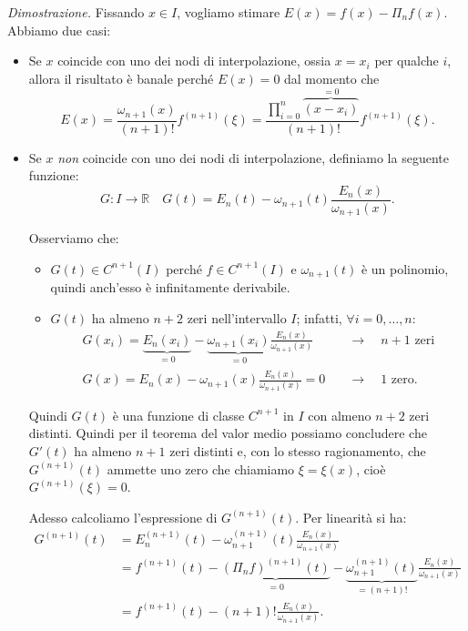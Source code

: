 \textit{Dimostrazione.}
Fissando $x\in I$, vogliamo stimare $E(x) =f(x) -\Pi _{n} f(x)$. Abbiamo due casi:
\begin{itemize}
\item Se $x$ coincide con uno dei nodi di interpolazione, ossia $x=x_{i}$ per qualche $i$, allora il risultato è banale perché $E(x) =0$ dal momento che
\begin{equation*}
E(x) =\frac{\omega _{n+1}(x)}{( n+1) !} f^{( n+1)}( \xi ) =\frac{\prod\nolimits ^{n}_{i=0}\overbrace{( x-x_{i})}^{=0}}{( n+1) !} f^{( n+1)}( \xi ).
\end{equation*}
\item Se $x$ \textit{non} coincide con uno dei nodi di interpolazione, definiamo la seguente funzione:
\begin{equation*}
G:I\rightarrow \mathbb{R} \quad G(t) =E_{n}(t) -\omega _{n+1}(t)\frac{E_{n}(x)}{\omega _{n+1}(x)}.
\end{equation*}

Osserviamo che:
\begin{itemize}
\item $G(t) \in C^{n+1}(I)$ perché $f\in C^{n+1}(I)$ e $\omega _{n+1}(t)$ è un polinomio, quindi anch'esso è infinitamente derivabile.
\item $G(t)$ ha almeno $n+2$ zeri nell'intervallo $I$; infatti, $\forall i=0,\dotsc ,n$:
\begin{align*}
	G( x_{i}) =\underbrace{E_{n}( x_{i})}_{=0} -\underbrace{\omega _{n+1}( x_{i})}_{=0}\frac{E_{n}(x)}{\omega _{n+1}(x)} & \quad \rightarrow \quad n+1 \text{ zeri} \\
	G(x) =E_{n}(x) -\omega _{n+1}(x)\frac{E_{n}(x)}{\omega _{n+1}(x)} =0 & \quad \rightarrow \quad 1 \text{ zero.}
\end{align*}
\end{itemize}

Quindi $G(t)$ è una funzione di classe $C^{n+1}$ in $I$ con almeno $n+2$ zeri distinti. Quindi per il teorema del valor medio possiamo concludere che $G'(t)$ ha almeno $n+1$ zeri distinti e, con lo stesso ragionamento, che $G^{( n+1)}(t)$ ammette uno zero che chiamiamo $\xi =\xi (x)$, cioè $G^{( n+1)}( \xi ) =0$.

Adesso calcoliamo l'espressione di $G^{( n+1)}(t)$. Per linearità si ha:
\begin{align*}
G^{( n+1)}(t) & =E^{( n+1)}_{n}(t) -\omega ^{( n+1)}_{n+1}(t)\frac{E_{n}(x)}{\omega _{n+1}(x)}\\
 & =f^{( n+1)}(t) -\underbrace{( \Pi _{n} f)^{( n+1)}(t)}_{=0} -\underbrace{\omega ^{( n+1)}_{n+1}(t)}_{=( n+1) !}\frac{E_{n}(x)}{\omega _{n+1}(x)}\\
 & =f^{( n+1)}(t) -( n+1) !\frac{E_{n}(x)}{\omega _{n+1}(x)}.
\end{align*}


\end{itemize}
